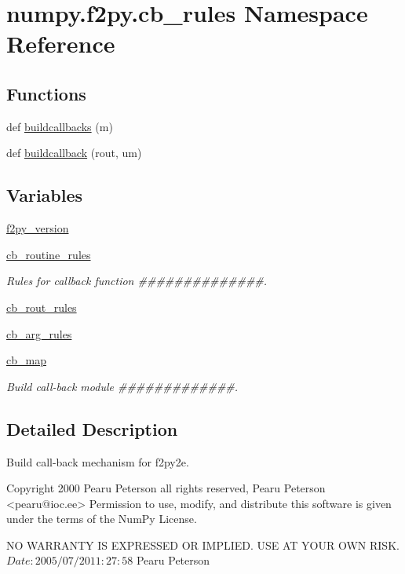 \hypertarget{namespacenumpy_1_1f2py_1_1cb__rules}{}\section{numpy.\+f2py.\+cb\+\_\+rules Namespace Reference}
\label{namespacenumpy_1_1f2py_1_1cb__rules}
\subsection*{Functions}
\begin{DoxyCompactItemize}
\item 
def \hyperlink{namespacenumpy_1_1f2py_1_1cb__rules_af535c113d09b48399852bf9dee08229e}{buildcallbacks} (m)
\item 
def \hyperlink{namespacenumpy_1_1f2py_1_1cb__rules_ae0847be6b5cbee154d75a4494c08bcc5}{buildcallback} (rout, um)
\end{DoxyCompactItemize}
\subsection*{Variables}
\begin{DoxyCompactItemize}
\item 
\hyperlink{namespacenumpy_1_1f2py_1_1cb__rules_a66c05e8a2f064762fd577a4008ceffbd}{f2py\+\_\+version}
\item 
\hyperlink{namespacenumpy_1_1f2py_1_1cb__rules_a24bb58c4659b79c47b50493b5b38024a}{cb\+\_\+routine\+\_\+rules}
\begin{DoxyCompactList}\small\item\em Rules for callback function \#\#\#\#\#\#\#\#\#\#\#\#\#\#. \end{DoxyCompactList}\item 
\hyperlink{namespacenumpy_1_1f2py_1_1cb__rules_a35884211dceaf7c872033e689be4f8f2}{cb\+\_\+rout\+\_\+rules}
\item 
\hyperlink{namespacenumpy_1_1f2py_1_1cb__rules_a2b9a6eb26c047ba1ec9a0ceb2d0f784e}{cb\+\_\+arg\+\_\+rules}
\item 
\hyperlink{namespacenumpy_1_1f2py_1_1cb__rules_afa1f53a0e757ea406c129a531230b9f0}{cb\+\_\+map}
\begin{DoxyCompactList}\small\item\em Build call-\/back module \#\#\#\#\#\#\#\#\#\#\#\#\#. \end{DoxyCompactList}\end{DoxyCompactItemize}


\subsection{Detailed Description}
\begin{DoxyVerb}Build call-back mechanism for f2py2e.

Copyright 2000 Pearu Peterson all rights reserved,
Pearu Peterson <pearu@ioc.ee>
Permission to use, modify, and distribute this software is given under the
terms of the NumPy License.

NO WARRANTY IS EXPRESSED OR IMPLIED.  USE AT YOUR OWN RISK.
$Date: 2005/07/20 11:27:58 $
Pearu Peterson\end{DoxyVerb}
 


